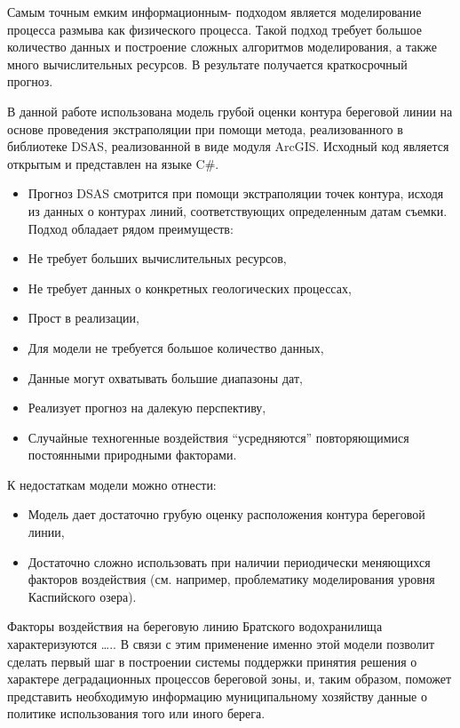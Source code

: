 \documentclass[732,14pt,final]{studrep}
\begin{document}
Самым точным емким  информационным- подходом является моделирование процесса размыва как физического процесса. Такой подход требует большое количество данных и построение сложных алгоритмов моделирования, а также много вычислительных ресурсов. В результате получается краткосрочный прогноз.

В данной работе использована модель грубой оценки контура береговой линии на основе проведения экстраполяции при помощи метода, реализованного в библиотеке DSAS, реализованной в виде модуля ArcGIS. Исходный код является открытым и представлен на языке C\#.

\begin{itemize}
\item Прогноз DSAS смотрится при помощи экстраполяции точек контура, исходя из данных о контурах линий, соответствующих определенным датам съемки. Подход обладает рядом преимуществ:
\item   Не требует больших вычислительных ресурсов,
\item   Не требует данных о конкретных геологических процессах,
\item   Прост в реализации,
\item   Для модели не требуется большое количество данных,
\item   Данные могут охватывать большие диапазоны дат,
\item   Реализует прогноз на далекую перспективу,
\item   Случайные техногенные воздействия “усредняются” повторяющимися постоянными природными факторами.
\end{itemize}

К недостаткам модели можно отнести:

\begin{itemize}
\item Модель дает достаточно грубую оценку расположения контура береговой линии,
\item   Достаточно сложно использовать при наличии периодически меняющихся факторов воздействия (см. например, проблематику моделирования уровня Каспийского озера).
\end{itemize}

Факторы воздействия на береговую линию Братского водохранилища характеризуются ….. В связи с этим применение именно этой модели позволит сделать первый шаг в построении системы поддержки принятия решения о характере деградационных процессов береговой зоны, и, таким образом, поможет представить необходимую информацию муниципальному хозяйству данные о политике использования того или иного берега.
\end{document}
